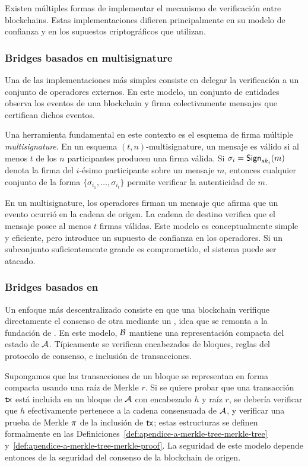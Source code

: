 Existen múltiples formas de implementar el mecanismo de verificación entre blockchains. Estas implementaciones difieren principalmente en su modelo de confianza y en los supuestos criptográficos que utilizan.

\subsubsection{Bridges basados en multisignature}

Una de las implementaciones más simples consiste en delegar la verificación a un conjunto de operadores externos. En este modelo, un conjunto de entidades observa los eventos de una blockchain y firma colectivamente mensajes que certifican dichos eventos.

Una herramienta fundamental en este contexto es el esquema de firma múltiple \emph{multisignature}. En un esquema $(t,n)$-multisignature, un mensaje es válido si al menos $t$ de los $n$ participantes producen una firma válida. Si $\sigma_i = \mathsf{Sign}_{sk_i}(m)$ denota la firma del $i$-ésimo participante sobre un mensaje $m$, entonces cualquier conjunto de la forma $\{\sigma_{i_1}, \ldots, \sigma_{i_t}\}$ permite verificar la autenticidad de $m$.

En un \Bridge multisignature, los operadores firman un mensaje que afirma que un evento ocurrió en la cadena de origen. La cadena de destino verifica que el mensaje posee al menos $t$ firmas válidas. Este modelo es conceptualmente simple y eficiente, pero introduce un supuesto de confianza en los operadores. Si un subconjunto suficientemente grande es comprometido, el sistema puede ser atacado.

\subsubsection{Bridges basados en \LightClients}

Un enfoque más descentralizado consiste en que una blockchain verifique directamente el consenso de otra mediante un \emph{\LightClient}, idea que se remonta a la fundación de \Bitcoin \cite{nakamoto2009bitcoin}. En este modelo, $\mathcal{B}$ mantiene una representación compacta del estado de $\mathcal{A}$. Típicamente se verifican encabezados de bloques, reglas del protocolo de consenso, e inclusión de transacciones.

Supongamos que las transacciones de un bloque se representan en forma compacta usando una raíz de Merkle $r$. Si se quiere probar que una transacción $\mathsf{tx}$ está incluida en un bloque de $\mathcal{A}$ con encabezado $h$ y raíz $r$, se debería verificar que $h$ efectivamente pertenece a la cadena consensuada de $\mathcal{A}$, y verificar una prueba de Merkle $\pi$ de la inclusión de $\mathsf{tx}$; estas estructuras se definen formalmente en las Definiciones~\ref{def:apendice-a-merkle-tree-merkle-tree} y~\ref{def:apendice-a-merkle-tree-merkle-proof}. La seguridad de este modelo depende entonces de la seguridad del consenso de la blockchain de origen.

